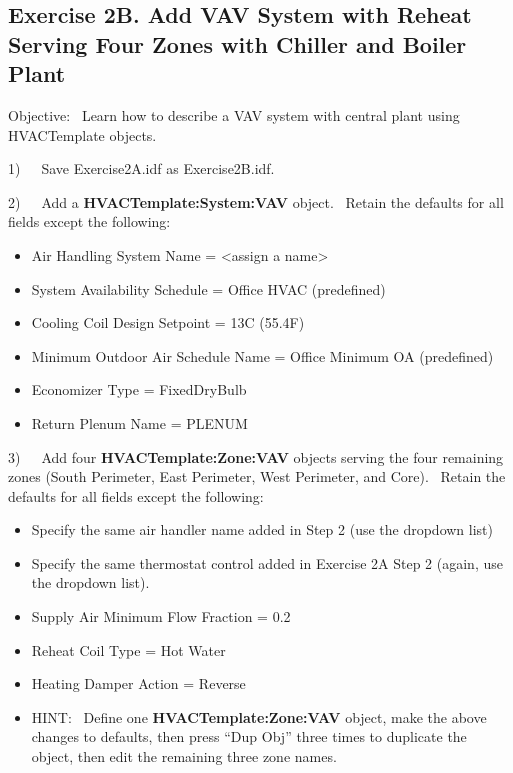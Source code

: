 \subsection{Exercise 2B. Add VAV System with Reheat Serving Four Zones with Chiller and Boiler Plant}\label{exercise-2b.-add-vav-system-with-reheat-serving-four-zones-with-chiller-and-boiler-plant}

Objective:~ Learn how to describe a VAV system with central plant using HVACTemplate objects.

1)~~~Save Exercise2A.idf as Exercise2B.idf.

2)~~~Add a \textbf{HVACTemplate:System:VAV} object.~ Retain the defaults for all fields except the following:

\begin{itemize}
\item
  Air Handling System Name = \textless{}assign a name\textgreater{}
\item
  System Availability Schedule = Office HVAC (predefined)
\item
  Cooling Coil Design Setpoint = 13C (55.4F)
\item
  Minimum Outdoor Air Schedule Name = Office Minimum OA (predefined)
\item
  Economizer Type = FixedDryBulb
\item
  Return Plenum Name = PLENUM
\end{itemize}

3)~~~Add four \textbf{HVACTemplate:Zone:VAV} objects serving the four remaining zones (South Perimeter, East Perimeter, West Perimeter, and Core).~ Retain the defaults for all fields except the following:

\begin{itemize}
\item
  Specify the same air handler name added in Step 2 (use the dropdown list)
\item
  Specify the same thermostat control added in Exercise 2A Step 2 (again, use the dropdown list).
\item
  Supply Air Minimum Flow Fraction = 0.2
\item
  Reheat Coil Type = Hot Water
\item
  Heating Damper Action = Reverse
\item
  HINT:~ Define one \textbf{HVACTemplate:Zone:VAV} object, make the above changes to defaults, then press ``Dup Obj'' three times to duplicate the object, then edit the remaining three zone names.
\end{itemize}

